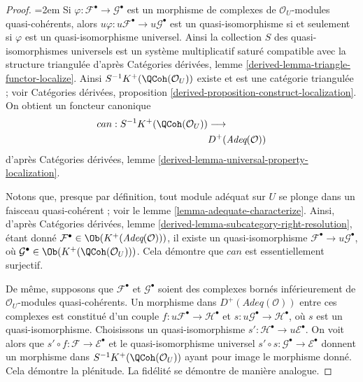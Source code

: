 \begin{proof}
{\emergencystretch=2em
Si $\varphi : \mathcal{F}^\bullet \to \mathcal{G}^\bullet$
est un morphisme de complexes de
$\mathcal{O}_U$-modules quasi-cohérents, alors $u\varphi : u\mathcal{F}^\bullet \to
u\mathcal{G}^\bullet$ est un quasi-isomorphisme si et seulement si $\varphi$ est
un quasi-isomorphisme universel. Ainsi la collection $S$
des quasi-isomorphismes universels est un système multiplicatif
saturé compatible avec la structure triangulée d'après
Catégories dérivées, lemme \ref{derived-lemma-triangle-functor-localize}.
Ainsi $S^{-1}K^+(\QCoh(\mathcal{O}_U))$ existe et est une
catégorie triangulée ; voir
Catégories dérivées, proposition
\ref{derived-proposition-construct-localization}.
On obtient un foncteur canonique
$$
\begin{aligned}
can : S^{-1}K^+(\QCoh(\mathcal{O}_U)) &\longrightarrow \\
&D^{+}(\textit{Adeq}(\mathcal{O}))
\end{aligned}
$$
d'après
Catégories dérivées, lemme \ref{derived-lemma-universal-property-localization}.
\par}

\medskip\noindent
Notons que, presque par définition, tout module adéquat sur $U$ se plonge
dans un faisceau quasi-cohérent ; voir le
lemme \ref{lemma-adequate-characterize}. Ainsi, d'après
Catégories dérivées, lemme \ref{derived-lemma-subcategory-right-resolution},
étant donné $\mathcal{F}^\bullet \in \Ob(K^+(\textit{Adeq}(\mathcal{O})))$,
il existe un quasi-isomorphisme
$\mathcal{F}^\bullet \to u\mathcal{G}^\bullet$,
où $\mathcal{G}^\bullet \in \Ob(K^+(\QCoh(\mathcal{O}_U)))$.
Cela démontre que $can$ est essentiellement surjectif.

\medskip\noindent
De même, supposons que $\mathcal{F}^\bullet$ et $\mathcal{G}^\bullet$
soient des complexes bornés inférieurement de $\mathcal{O}_U$-modules quasi-cohérents.
Un morphisme dans $D^+(\textit{Adeq}(\mathcal{O}))$ entre ces
complexes est constitué d'un couple $f : u\mathcal{F}^\bullet \to \mathcal{H}^\bullet$
et $s : u\mathcal{G}^\bullet \to \mathcal{H}^\bullet$, où $s$
est un quasi-isomorphisme. Choisissons un quasi-isomorphisme
$s' : \mathcal{H}^\bullet \to u\mathcal{E}^\bullet$. On voit alors que
$s' \circ f : \mathcal{F} \to \mathcal{E}^\bullet$ et le
quasi-isomorphisme universel
$s' \circ s : \mathcal{G}^\bullet \to \mathcal{E}^\bullet$ donnent
un morphisme dans $S^{-1}K^{+}(\QCoh(\mathcal{O}_U))$ ayant pour image
le morphisme donné. Cela démontre la plénitude.
La fidélité se démontre de manière analogue.
\end{proof}

